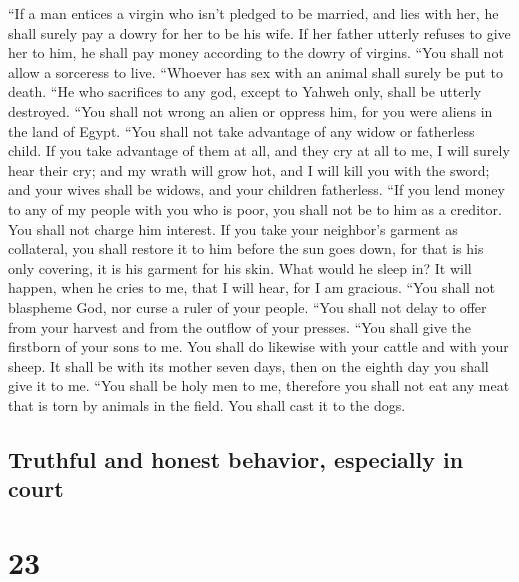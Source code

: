  ``If a man entices a virgin who isn't pledged to be
married, and lies with her, he shall surely pay a dowry for her to be
his wife.  If her father utterly refuses to give her to
him, he shall pay money according to the dowry of virgins.
 ``You shall not allow a sorceress to live.
 ``Whoever has sex with an animal shall surely be put to
death.  ``He who sacrifices to any god, except to Yahweh
only, shall be utterly destroyed.  ``You shall not wrong
an alien or oppress him, for you were aliens in the land of Egypt.
 ``You shall not take advantage of any widow or
fatherless child.  If you take advantage of them at all,
and they cry at all to me, I will surely hear their cry; 
and my wrath will grow hot, and I will kill you with the sword; and your
wives shall be widows, and your children fatherless. 
``If you lend money to any of my people with you who is poor, you shall
not be to him as a creditor. You shall not charge him interest.
 If you take your neighbor's garment as collateral, you
shall restore it to him before the sun goes down,  for
that is his only covering, it is his garment for his skin. What would he
sleep in? It will happen, when he cries to me, that I will hear, for I
am gracious.  ``You shall not blaspheme God, nor curse a
ruler of your people.  ``You shall not delay to offer
from your harvest and from the outflow of your presses. ``You shall give
the firstborn of your sons to me.  You shall do likewise
with your cattle and with your sheep. It shall be with its mother seven
days, then on the eighth day you shall give it to me. 
``You shall be holy men to me, therefore you shall not eat any meat that
is torn by animals in the field. You shall cast it to the dogs.

\hypertarget{truthful-and-honest-behavior-especially-in-court}{%
\subsection{Truthful and honest behavior, especially in
court}\label{truthful-and-honest-behavior-especially-in-court}}

\hypertarget{section-22}{%
\section{23}\label{section-22}}

